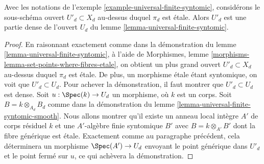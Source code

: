 \begin{lemma}
\label{lemma-universal-finite-syntomic-etale}
Avec les notations de l'exemple \ref{example-universal-finite-syntomic},
considérons le sous-schéma ouvert $U'_d \subset X_d$ au-dessus duquel
$\pi_d$ est étale. Alors $U'_d$ est une partie dense de
l'ouvert $U_d$ du lemme \ref{lemma-universal-finite-syntomic}.
\end{lemma}

\begin{proof}
En raisonnant exactement comme dans la démonstration du
lemme \ref{lemma-universal-finite-syntomic}, à l'aide de
Morphismes, lemme \ref{morphisms-lemma-set-points-where-fibres-etale},
on obtient un plus grand ouvert $U'_d \subset X_d$ au-dessus duquel $\pi_d$ est
étale. De plus, un morphisme étale étant syntomique, on voit
que $U'_d \subset U_d$. Pour achever la démonstration, il faut montrer
que $U'_d \subset U_d$ est dense. Soit $u : \Spec(k) \to U_d$ un morphisme,
où $k$ est un corps. Soit $B = k \otimes_{A_d} B_d$ comme dans la
démonstration du lemme \ref{lemma-universal-finite-syntomic-smooth}.
Nous allons montrer qu'il existe un anneau local intègre $A'$ de corps résiduel $k$
et une $A'$-algèbre finie syntomique $B'$ avec $B = k \otimes_{A'} B'$
dont la fibre générique est étale. Exactement comme au paragraphe précédent,
cela déterminera un morphisme $\Spec(A') \to U_d$ envoyant le
point générique dans $U'_d$ et le point fermé sur $u$, ce qui
achèvera la démonstration.


\end{proof}
